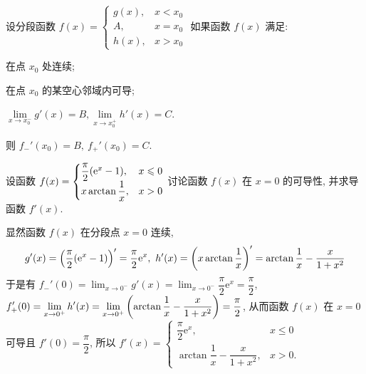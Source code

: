 \begin{theorem}
    设分段函数 $f(x)=\begin{cases}
            g(x) ,& x<x_0 \\A,&x=x_0\\h(x),&x>x_0
        \end{cases}$ 如果函数 $f(x)$ 满足:
    \begin{enumerate*}[label=(\arabic{*})]
        \item 在点 $x_0$ 处连续;
        \item 在点 $x_0$ 的某空心邻域内可导;
        \item $\lim\limits_{x\to x_0^-}g'(x)=B,\lim\limits_{x\to x_0^+}h'(x)=C$.
    \end{enumerate*}
    则 $f_{-}'(x_0)=B,~f_{+}'(x_0)=C.$
\end{theorem}

\begin{example}
    设函数 $f(x)=\begin{cases}
            \dfrac{\pi}{2}\qty(\mathrm{e}^x-1) ,&x\leqslant 0 \\ x\arctan\dfrac{1}{x},&x>0
        \end{cases}$
    讨论函数 $f(x)$ 在 $x=0$ 的可导性, 并求导函数 $f'(x)$.
\end{example}
\begin{solution}
    显然函数 $f(x)$ 在分段点 $x=0$ 连续, $$g'(x)=\qty(\dfrac{\pi}{2}\qty(\mathrm{e}^x-1))'=\dfrac{\pi}{2}\mathrm{e}^x,~h'(x)=\qty(x\arctan\dfrac{1}{x})'=\arctan\dfrac{1}{x}-\dfrac{x}{1+x^2}$$
    于是有 $\displaystyle f_-'(0)=\lim_{x\to0^-}g'(x)=\lim_{x\to0^-}\dfrac{\pi}{2}\mathrm{e}^x=\dfrac{\pi}{2}$, $\displaystyle f_+'(0)=\lim_{x\to0^+}h'(x)=\lim_{x\to0^+}\qty(\arctan\dfrac{1}{x}-\dfrac{x}{1+x^2})=\dfrac{\pi}{2}$, 
    从而函数 $f(x)$ 在 $x=0$ 可导且 $f'(0)=\dfrac{\pi}{2}$, 所以 $f'(x)=\begin{cases}
            \dfrac{\pi}{2}\mathrm{e}^x ,&x\leqslant 0 \\ \arctan\dfrac{1}{x}-\dfrac{x}{1+x^2},&x>0.
        \end{cases}$
\end{solution}